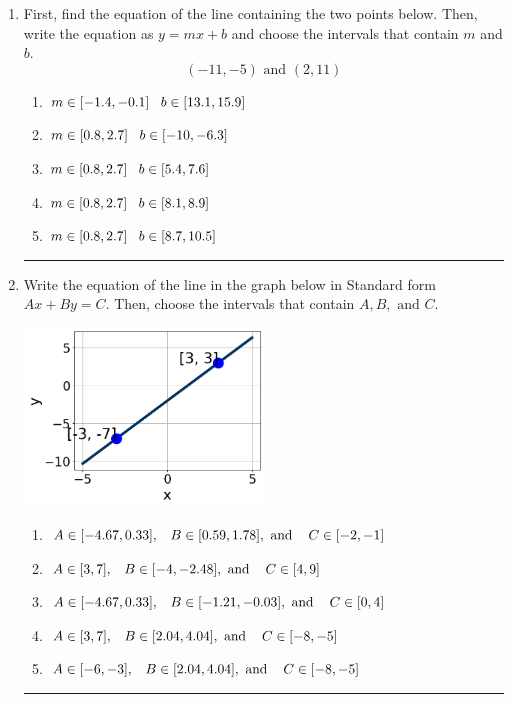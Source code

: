 \documentclass[14pt]{extbook}
\newcommand{\litem}[1]{\item#1\hspace*{-1cm}\rule{\textwidth}{0.4pt}}
\begin{document}
\begin{enumerate}
\litem{
First, find the equation of the line containing the two points below. Then, write the equation as $ y=mx+b $ and choose the intervals that contain $m$ and $b$.\[ (-11, -5) \text{ and } (2, 11) \]\begin{enumerate}[label=\Alph*.]
\item \( m \in [-1.4, -0.1] \hspace*{3mm} b \in [13.1, 15.9] \)
\item \( m \in [0.8, 2.7] \hspace*{3mm} b \in [-10, -6.3] \)
\item \( m \in [0.8, 2.7] \hspace*{3mm} b \in [5.4, 7.6] \)
\item \( m \in [0.8, 2.7] \hspace*{3mm} b \in [8.1, 8.9] \)
\item \( m \in [0.8, 2.7] \hspace*{3mm} b \in [8.7, 10.5] \)

\end{enumerate} }
\litem{
Write the equation of the line in the graph below in Standard form $Ax+By=C$. Then, choose the intervals that contain $A, B, \text{ and } C$.
\begin{center}
    \includegraphics[width=0.5\textwidth]{../Figures/linearGraphToStandardB.png}
\end{center}
\begin{enumerate}[label=\Alph*.]
\item \( A \in [-4.67, 0.33], \hspace{3mm} B \in [0.59, 1.78], \text{ and } \hspace{3mm} C \in [-2, -1] \)
\item \( A \in [3, 7], \hspace{3mm} B \in [-4, -2.48], \text{ and } \hspace{3mm} C \in [4, 9] \)
\item \( A \in [-4.67, 0.33], \hspace{3mm} B \in [-1.21, -0.03], \text{ and } \hspace{3mm} C \in [0, 4] \)
\item \( A \in [3, 7], \hspace{3mm} B \in [2.04, 4.04], \text{ and } \hspace{3mm} C \in [-8, -5] \)
\item \( A \in [-6, -3], \hspace{3mm} B \in [2.04, 4.04], \text{ and } \hspace{3mm} C \in [-8, -5] \)


\end{enumerate}}
\end{enumerate}
\end{document}
